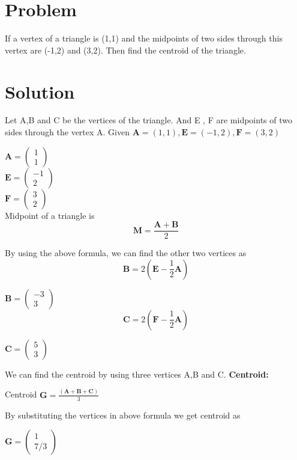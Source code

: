 \documentclass[10pt, a4paper]{article}
\title{\mytitle}
\author{\myauthor\hspace{1em}\\\contact\\FWC22097 -\hspace{0.5em}IITH\hspace{0.5em}\mymodule\hspace{6em}}
\date{}
\newcommand{\myvec}[1]{\ensuremath{\begin{pmatrix}#1\end{pmatrix}}}
\let\vec\mathbf
\begin{document}
	\maketitle
	\tableofcontents
   \section{Problem}
 If a vertex of a triangle is (1,1) and the midpoints of two sides through this vertex are (-1,2) and (3,2). Then find the centroid of the triangle.

   \section{Solution}

Let A,B and C be the vertices of the triangle. And E , F are midpoints of two sides through the vertex A.
Given $\vec{A}=(1,1), \vec{E}=(-1,2), \vec{F}=(3,2)$ 
\begin{center}
$\vec{A}=\myvec{ 1 \\ 1 }$\\
$\vec{E}=\myvec{-1 \\ 2 }$\\
$\vec{F}=\myvec{ 3 \\ 2 }$\\
Midpoint of a triangle is 
$$ \vec{M}=\frac{\vec{A}+\vec{B}}{2}$$

By using the above formula, we can find the other two vertices as
$$\vec{B}=2\left(\vec{E}-\frac{1}{2}\vec{A}\right)$$

$\vec{B}=\myvec{-3 \\ 3 }$\\

$$\vec{C}=2\left(\vec{F}-\frac{1}{2}\vec{A}\right)$$

$\vec{C}=\myvec{ 5 \\ 3 }$\\
\end{center}

We can find the centroid by using three vertices A,B and C.
\textbf{Centroid:} 
		\begin{center}
		
		Centroid $\vec{G}=\frac{(\vec{A}+\vec{B}+\vec{C})}{3}$
		
		By substituting the vertices in above formula we get centroid as
		 
		$\vec{G}=\myvec{ 1 \\ 7/3}$\\
	\end{center}
 
\end{document}
